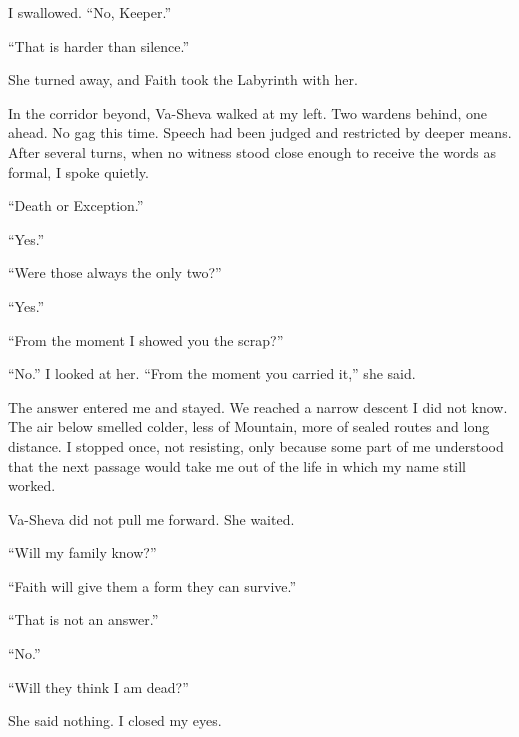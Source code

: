 I swallowed. ``No, Keeper.''\par

``That is harder than silence.''\par

She turned away, and Faith took the Labyrinth with her.\par

In the corridor beyond, Va-Sheva walked at my left. Two wardens behind, one ahead. No gag this time. Speech had been judged and restricted by deeper means. After several turns, when no witness stood close enough to receive the words as formal, I spoke quietly.\par

``Death or Exception.''\par

``Yes.''\par

``Were those always the only two?''\par

``Yes.''\par

``From the moment I showed you the scrap?''\par

``No.'' I looked at her. ``From the moment you carried it,'' she said.\par

The answer entered me and stayed. We reached a narrow descent I did not know. The air below smelled colder, less of Mountain, more of sealed routes and long distance. I stopped once, not resisting, only because some part of me understood that the next passage would take me out of the life in which my name still worked.\par

Va-Sheva did not pull me forward. She waited.\par

``Will my family know?''\par

``Faith will give them a form they can survive.''\par

``That is not an answer.''\par

``No.''\par

``Will they think I am dead?''\par

She said nothing. I closed my eyes.\par

